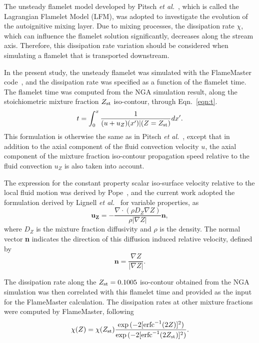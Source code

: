\documentclass[review,3p,times]{elsarticleUS}
\begin{document}
The unsteady flamelet model developed by Pitsch \emph{et al.}~\cite{pitsch98a}, which is called the Lagrangian Flamelet Model (LFM), was adopted to investigate the evolution of the autoignitive mixing layer.  Due to mixing processes, the dissipation rate $\chi$, which can influence the flamelet solution significantly, decreases along the stream axis.  Therefore, this dissipation rate variation should be considered when simulating a flamelet that is transported downstream.  

In the present study, the unsteady flamelet was simulated with the FlameMaster code~\cite{flamemaster}, and the dissipation rate was specified as a function of the flamelet time.  The flamelet time was computed from the NGA simulation result, along the stoichiometric mixture fraction $Z_{\rm st}$ iso-contour, through Eqn.~\ref{eqn:t}. 
 \begin{equation} \label{eqn:t}
t = \int ^{x}_{0} \frac{1}{(u + u_Z)(x')|(Z=Z_{\rm st})} dx'.
\end{equation}
This formulation is otherwise the same as in Pitsch \emph {et al.}~\cite{pitsch98a}, except that in addition to the axial component of the fluid convection velocity $u$, the axial component of the mixture fraction iso-contour propagation speed relative to the fluid convection $u_Z$ is also taken into account.

The expression for the constant property scalar iso-surface velocity relative to the local fluid motion was derived by Pope~\cite{pope88(S.B. Pope, Int.J. Eng. Sci. 26 (1988) 445-469)}, and the current work adopted the formulation derived by Lignell \emph {et al.}~\cite{lignell07(D.O. Lignell Combustion and Flames 151 (2007) 2-28)} for variable properties, as
\begin{equation}
\mathbf{u_Z} = -\frac{\nabla \cdot (\rho D_Z \nabla Z) }{\rho |\nabla Z|} \mathbf{n},
\end{equation}  
where $D_Z$ is the mixture fraction diffusivity and $\rho$ is the density.  The normal vector \textbf{n} indicates the direction of this diffusion induced relative velocity, defined by  
\begin{equation}
\mathbf{n} = \frac{\nabla Z}{|\nabla Z|}.
\end{equation}

The dissipation rate along the $Z_{\rm st} = 0.1005$ iso-contour obtained from the NGA simulation was then correlated with this flamelet time and provided as the input for the FlameMaster calculation.  The dissipation rates at other mixture fractions were computed by FlameMaster, following~\cite{petersbook}
\begin{equation} \label{eqn:Zref}
\chi{(Z)} = \chi{(Z_{\rm st})} \frac{\exp{(-2[{\rm erfc}^{-1}(2Z)]^2)}}{\exp{(-2[{\rm erfc}^{-1}(2Z_{\rm st})]^2)}}.
\end{equation}
\end{document}
